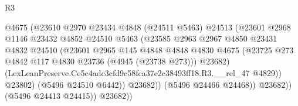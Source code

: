 \begin{lexlean}{R3}
\begin{coremodule}
                                            @4675
                                            (@23610
                                              @2970
                                              @23434
                                              @4848
                                              (@24511 @5463)
                                              @24513
                                              (@23601
                                                @2968
                                                @1146
                                                @23432
                                                @4852
                                                @24510
                                                @5463
                                                (@23585
                                                  @2963
                                                  @2967
                                                  @4850
                                                  @23431
                                                  @4832
                                                  @24510
                                                  (@23601
                                                    @2965
                                                    @145
                                                    @4848
                                                    @4848
                                                    @4830
                                                    @4675
                                                    (@23725
                                                      @273
                                                      @4842
                                                      @117
                                                      @4830
                                                      @23736
                                                      (@4945 (@23738 @273)))
                                                    @23682)
                                                  (LexLeanPreserve.Ce5c4adc3cfd9c58fca37e2c38493ff18.R3.__rel_47
                                                    @4829))
                                                @23802)
                                              (@5496 @24510 @6442))
                                            @23682))
                                        (@5496 @24466 @24468))
                                      @23682))
                                  (@5496 @24413 @24415))
                                @23682))

\end{coremodule}
\end{lexlean}
